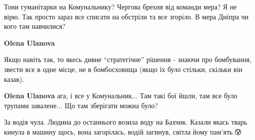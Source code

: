 
 
 
 
 

\qqSecCmt


Тони гуманітарки на Комунальнику? Чергова брехня від команди мера? Я не вірю.
Так просто зараз все списати на обстріли та все згоріло. В мера Дніпра чи кого
там навчилися?

\begin{itemize} %
\textbf{Olena Ulanova} 

Якщо навіть так, то якесь дивне \enquote{стратегічне} рішення - знаючи про бомбування,
звести все в одне місце, не в бомбосховища (якщо їх було стільки, скільки він
казав).

\textbf{Olena Ulanova} ага, і все у Комунальник... Там такі бої йшли, там все було трупами завалене... Що там зберігати можна було?

\end{itemize} %


За водія чула. Людина до останнього возила воду на Бахчик. Казали якась тварь
кинула в машину щось, вона загорілась, водій загинув, світла йому пам'ять.😰

